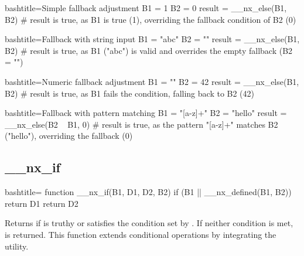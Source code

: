 \begin{NexCodeBox}{bash}{title={Simple fallback adjustment}}
	B1 = 1
	B2 = 0
	result = __nx_else(B1, B2)
	# result is true, as B1 is true (1), overriding the fallback condition of B2 (0)
\end{NexCodeBox}

\begin{NexCodeBox}{bash}{title={Fallback with string input}}
	B1 = "abc"
	B2 = ""
	result = __nx_else(B1, B2)
	# result is true, as B1 ("abc") is valid and overrides the empty fallback (B2 = "")
\end{NexCodeBox}

\begin{NexCodeBox}{bash}{title={Numeric fallback adjustment}}
	B1 = ""
	B2 = 42
	result = __nx_else(B1, B2)
	# result is true, as B1 fails the condition, falling back to B2 (42)
\end{NexCodeBox}

\begin{NexCodeBox}{bash}{title={Fallback with pattern matching}}
	B1 = "[a-z]+"
	B2 = "hello"
	result = __nx_else(B2 ~ B1, 0)
	# result is true, as the pattern "[a-z]+" matches B2 ("hello"), overriding the fallback (0)
\end{NexCodeBox}

\newpage
\subsection{__nx_if}
\label{__nx_if}
\begin{NexCodeBox}{bash}{title={}}
function __nx_if(B1, D1, D2, B2) {
	if (B1 || __nx_defined(B1, B2))
		return D1
	return D2
}
\end{NexCodeBox}

\begin{NexMainBox}
	\begin{NexMainBox}
		Returns  if  is truthy or satisfies the condition set by . If neither condition is met,  is returned. This function extends conditional operations by integrating the  utility.
	\end{NexMainBox}
	\begin{NexMainBox}
		\begin{NexListDark}
		\end{NexListDark}
	\end{NexMainBox}
\end{NexMainBox}


